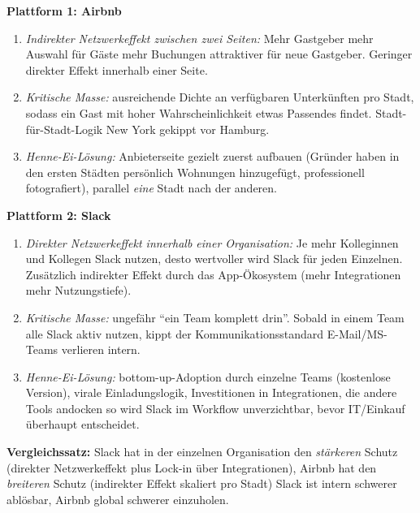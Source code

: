 \documentclass[11pt,a4paper,oneside]{article}
\begin{document}
\begin{loesungbox}
\textbf{Plattform 1: Airbnb}
\begin{enumerate}
  \item \emph{Indirekter Netzwerkeffekt zwischen zwei Seiten:} Mehr Gastgeber \textrightarrow{} mehr Auswahl für Gäste \textrightarrow{} mehr Buchungen \textrightarrow{} attraktiver für neue Gastgeber. Geringer direkter Effekt innerhalb einer Seite.
  \item \emph{Kritische Masse:} ausreichende Dichte an verfügbaren Unterkünften pro Stadt, sodass ein Gast mit hoher Wahrscheinlichkeit etwas Passendes findet. Stadt-für-Stadt-Logik \textendash{} New York gekippt vor Hamburg.
  \item \emph{Henne-Ei-Lösung:} Anbieterseite gezielt zuerst aufbauen (Gründer haben in den ersten Städten persönlich Wohnungen hinzugefügt, professionell fotografiert), parallel \emph{eine} Stadt nach der anderen.
\end{enumerate}

\textbf{Plattform 2: Slack}
\begin{enumerate}
  \item \emph{Direkter Netzwerkeffekt innerhalb einer Organisation:} Je mehr Kolleginnen und Kollegen Slack nutzen, desto wertvoller wird Slack für jeden Einzelnen. Zusätzlich indirekter Effekt durch das App-Ökosystem (mehr Integrationen \textrightarrow{} mehr Nutzungstiefe).
  \item \emph{Kritische Masse:} ungefähr ``ein Team komplett drin''. Sobald in einem Team alle Slack aktiv nutzen, kippt der Kommunikationsstandard \textendash{} E-Mail/MS-Teams verlieren intern.
  \item \emph{Henne-Ei-Lösung:} bottom-up-Adoption durch einzelne Teams (kostenlose Version), virale Einladungslogik, Investitionen in Integrationen, die andere Tools andocken \textendash{} so wird Slack im Workflow unverzichtbar, bevor IT/Einkauf überhaupt entscheidet.
\end{enumerate}

\textbf{Vergleichssatz:} Slack hat in der einzelnen Organisation den \emph{stärkeren} Schutz (direkter Netzwerkeffekt plus Lock-in über Integrationen), Airbnb hat den \emph{breiteren} Schutz (indirekter Effekt skaliert pro Stadt) \textendash{} Slack ist intern schwerer ablösbar, Airbnb global schwerer einzuholen.
\end{loesungbox}

\clearpage

\end{document}
